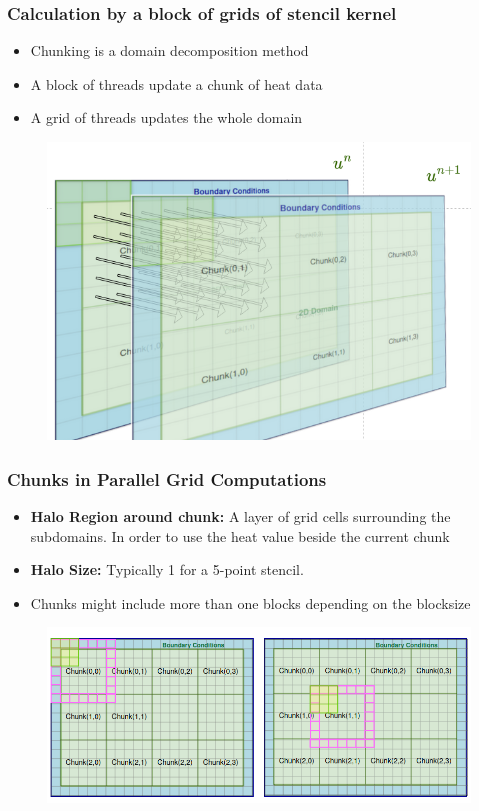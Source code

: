 \documentclass[9pt]{beamer}
\begin{document}
\begin{frame}
\frametitle{Calculation by a block of grids of stencil kernel}
\begin{itemize}

    \item Chunking is a domain decomposition method
    \item A block of threads update a chunk of heat data
    \item A grid of threads updates the whole domain
\end{itemize}
\begin{figure}
    \centering
    \includegraphics[width=0.75\linewidth]{Screenshot from 2024-09-04 13-55-10.png}
\end{figure}
\end{frame}

\begin{frame}
\frametitle{Chunks in Parallel Grid Computations}
\begin{itemize}
    \item \textbf{Halo Region around chunk:} A layer of grid cells surrounding the subdomains. In order to use the heat value beside the current chunk
    \item \textbf{Halo Size:} Typically 1 for a 5-point stencil.
    \item Chunks might include more than one blocks depending on the blocksize
\end{itemize}

\begin{figure}
    \centering
    \includegraphics[width=0.8\linewidth]{Screenshot from 2024-08-30 19-03-50.png}
    \label{fig:enter-label}
\end{figure}
\end{frame}
\end{document}
